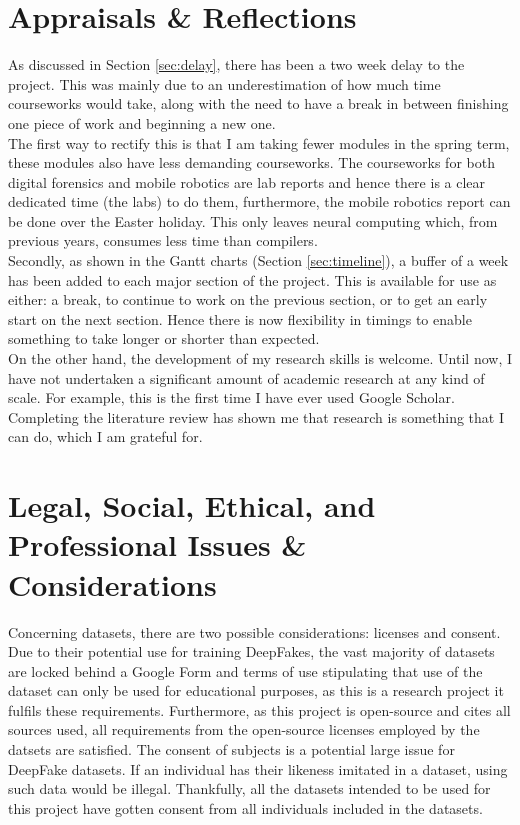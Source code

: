 \documentclass{article}
\begin{document}
\section{Appraisals \& Reflections}

As discussed in Section \ref{sec:delay}, there has been a two week delay to the project. This was mainly due to an underestimation of how much time courseworks would take, along with the need to have a break in between finishing one piece of work and beginning a new one.\\

The first way to rectify this is that I am taking fewer modules in the spring term, these modules also have less demanding courseworks. The courseworks for both digital forensics and mobile robotics are lab reports and hence there is a clear dedicated time (the labs) to do them, furthermore, the mobile robotics report can be done over the Easter holiday. This only leaves neural computing which, from previous years, consumes less time than compilers.\\

Secondly, as shown in the Gantt charts (Section \ref{sec:timeline}), a buffer of a week has been added to each major section of the project. This is available for use as either: a break, to continue to work on the previous section, or to get an early start on the next section. Hence there is now flexibility in timings to enable something to take longer or shorter than expected.\\

On the other hand, the development of my research skills is welcome. Until now, I have not undertaken a significant amount of academic research at any kind of scale. For example, this is the first time I have ever used Google Scholar. Completing the literature review has shown me that research is something that I can do, which I am grateful for.

\section{Legal, Social, Ethical, and Professional Issues \& Considerations}

Concerning datasets, there are two possible considerations: licenses and consent. Due to their potential use for training DeepFakes, the vast majority of datasets are locked behind a Google Form and terms of use stipulating that use of the dataset can only be used for educational purposes, as this is a research project it fulfils these requirements. Furthermore, as this project is open-source and cites all sources used, all requirements from the open-source licenses employed by the datsets are satisfied. The consent of subjects is a potential large issue for DeepFake datasets. If an individual has their likeness imitated in a dataset, using such data would be illegal. Thankfully, all the datasets intended to be used for this project have gotten consent from all individuals included in the datasets.\\
\end{document}
